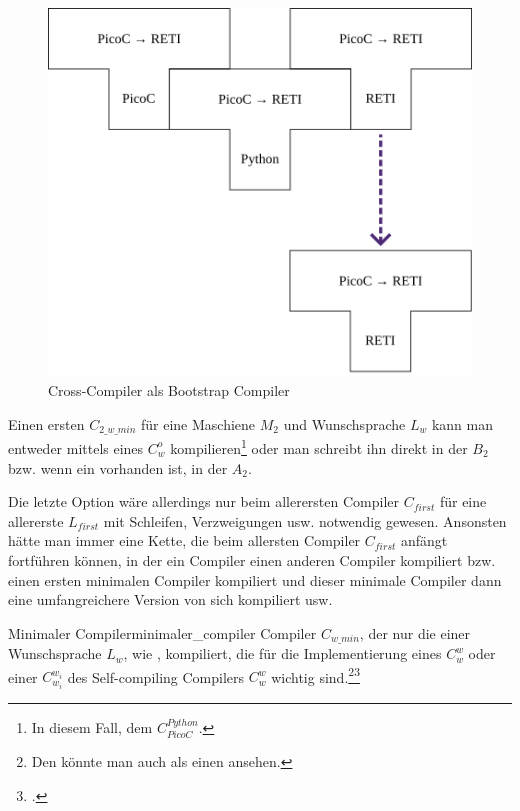 \begin{figure}[H]
  \centering
  \includegraphics[width=0.5\linewidth]{./figures/cross_compiling.png}
  \caption{Cross-Compiler als Bootstrap Compiler}
\end{figure}

\begin{Special_Paragraph}
  Einen ersten  $C_{2\_w\_min}$ für eine Maschiene $M_2$ und Wunschsprache $L_w$ kann man entweder mittels eines   $C_w^o$ kompilieren\footnote{In diesem Fall, dem  $C_{PicoC}^{Python}$.} oder man schreibt ihn direkt in der  $B_2$ bzw. wenn ein  vorhanden ist, in der  $A_2$.

  Die letzte Option wäre allerdings nur beim allerersten Compiler $C_{first}$ für eine allererste  $L_{first}$ mit Schleifen, Verzweigungen usw. notwendig gewesen. Ansonsten hätte man immer eine Kette, die beim allersten Compiler $C_{first}$ anfängt fortführen können, in der ein Compiler einen anderen Compiler kompiliert bzw. einen ersten minimalen Compiler kompiliert und dieser minimale Compiler dann eine umfangreichere Version von sich kompiliert usw.
\end{Special_Paragraph}

\begin{Definition}{Minimaler Compiler}{minimaler_compiler}
  Compiler $C_{w\_min}$, der nur die  einer Wunschsprache $L_w$, wie ,   kompiliert, die für die Implementierung eines  $C_{w}^{w}$ oder einer  $C_{w_i}^{w_i}$ des Self-compiling Compilers $C_w^w$ wichtig sind.\footnote{Den  könnte man auch als einen  ansehen.}\footcite{thiemann_compilerbau_2021}
\end{Definition}

